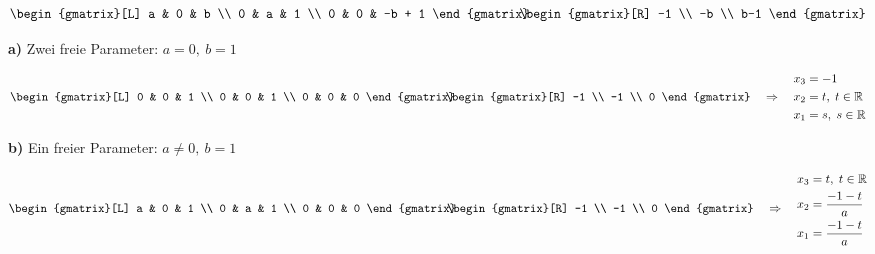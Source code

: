\begin{solution}
    \begin{equation*}
        \begin{gmatrix}[L]
            a & 0 & b \\
            0 & a & 1 \\
            0 & 0 & -b + 1
        \end{gmatrix} \hspace{-0.75em}
        \begin{gmatrix}[R]
            -1 \\ -b \\ b-1
        \end{gmatrix}
    \end{equation*}

    \vspace{1\baselineskip}

    \textbf{a)} Zwei freie Parameter: \( a = 0, \ b = 1\)

    \begin{equation*}
        \begin{gmatrix}[L]
            0 & 0 & 1 \\
            0 & 0 & 1 \\
            0 & 0 & 0
        \end{gmatrix} \hspace{-0.75em}
        \begin{gmatrix}[R]
            -1 \\ -1 \\ 0
        \end{gmatrix} \quad \Rightarrow \quad
        \begin{aligned}
            x_3 &= -1 \\
            x_2 &= t, \; t \in \mathbb{R} \\
            x_1 &= s, \; s \in \mathbb{R}    
        \end{aligned}
    \end{equation*}

    \textbf{b)} Ein freier Parameter: \( a \neq 0, \ b = 1\)

        \begin{equation*}
        \begin{gmatrix}[L]
            a & 0 & 1 \\
            0 & a & 1 \\
            0 & 0 & 0
        \end{gmatrix} \hspace{-0.75em}
        \begin{gmatrix}[R]
            -1 \\ -1 \\ 0
        \end{gmatrix} \quad \Rightarrow \quad
        \begin{aligned}
            x_3 &= t, \; t \in \mathbb{R} \\
            x_2 &= \frac{-1-t}{a} \\
            x_1 &= \frac{-1-t}{a}
        \end{aligned}
    \end{equation*}


\end{solution}
